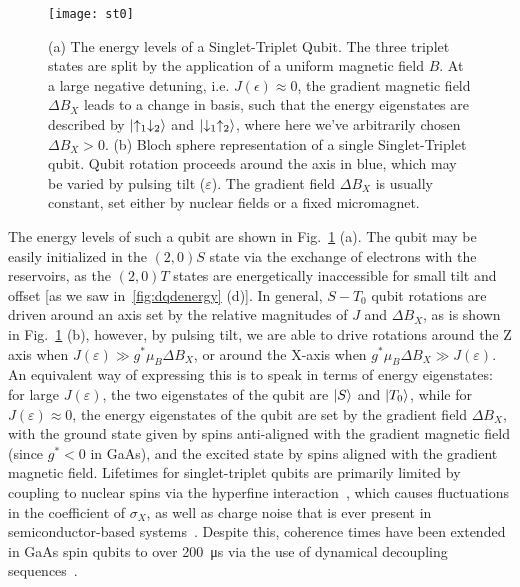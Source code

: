\begin{figure}
\texttt{[image: st0]}
\caption[Energy levels and eigenstates of a Singlet-Triplet qubit]
{\label{fig:st0}(a) The energy levels of a Singlet-Triplet Qubit. The three triplet states are split by the application of a
uniform magnetic field $B$. At a large negative detuning, i.e. $J(\epsilon) \approx 0$, the gradient magnetic field $\Delta B_X$ leads to a
change in basis, such that the energy eigenstates are described by $\ket{\uparrow_1\downarrow_2}$ and $\ket{\downarrow_1\uparrow_2}$,
where here we've arbitrarily chosen $\Delta B_X > 0$.
(b) Bloch sphere representation of a single Singlet-Triplet qubit. Qubit rotation proceeds around the axis in blue,
which may be varied by pulsing tilt ($\varepsilon$). The gradient field $\Delta B_X$ is usually constant, set either
by nuclear fields or a fixed micromagnet.}
\end{figure}

The energy levels of such a qubit are shown in Fig.~\ref{fig:st0} (a). The qubit may be easily initialized in the $(2, 0)S$ state via
the exchange of electrons with the reservoirs, as the $(2, 0)T$ states are energetically inaccessible for small tilt and offset [as we
saw in~\ref{fig:dqdenergy} (d)]. In general, $S-T_0$ qubit rotations are driven around an axis set by the relative magnitudes
of $J$ and $\Delta B_X$, as is shown in Fig.~\ref{fig:st0} (b), however, by pulsing tilt, we are able to drive rotations around the Z axis
when $J(\varepsilon) \gg g^* \mu_B \Delta B_X$, or around the X-axis when $g^* \mu_B \Delta B_X \gg J(\varepsilon)$. An equivalent way of
expressing this is to speak in terms of energy eigenstates: for large $J(\varepsilon)$, the two eigenstates of the qubit are $\ket{S}$ and
$\ket{T_0}$, while for $J(\varepsilon) \approx 0$, the energy eigenstates of the qubit are set by the gradient field $\Delta B_X$, with
the ground state given by spins anti-aligned with the gradient magnetic field (since $g^* < 0$ in GaAs), and the excited state by spins aligned with
the gradient magnetic field. Lifetimes for singlet-triplet qubits are primarily limited by coupling to nuclear spins via the hyperfine
interaction~\cite{nnano.2016.170}, which causes fluctuations in the coefficient of $\sigma_X$, as well as charge noise that is ever present
in semiconductor-based systems~\cite{PhysRevLett.110.146804}. Despite this, coherence times have been extended in GaAs spin qubits to
over \SI{200}{\micro\second} via the use of dynamical decoupling sequences~\cite{nphys1856}.

